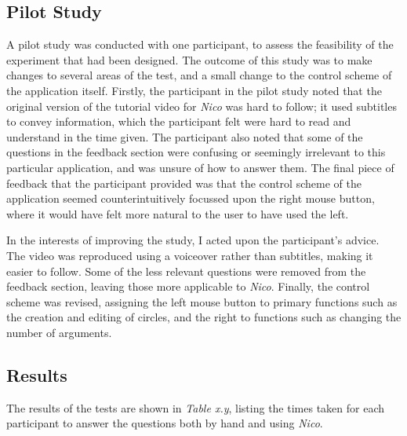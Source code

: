\documentclass[12pt,twoside,notitlepage,xetex]{report}
\begin{document}
\subsection{Pilot Study}

A pilot study was conducted with one participant, to assess the feasibility of
the experiment that had been designed.  The outcome of this study was to make
changes to several areas of the test, and a small change to the control scheme
of the application itself.  Firstly, the participant in the pilot study noted that the
original version of the tutorial video for \emph{Nico} was hard to follow; it
used subtitles to convey information, which the participant felt were hard to
read and understand in the time given.  The participant also noted that some of the
questions in the feedback section were confusing or seemingly irrelevant to
this particular application, and was unsure of how to answer them.  The final
piece of feedback that the participant provided was that the control scheme of the
application seemed counterintuitively focussed upon the right mouse button,
where it would have felt more natural to the user to have used the left.

In the interests of improving the study, I acted upon the participant's advice.
The video was reproduced using a voiceover rather than subtitles, making it
easier to follow.  Some of the less relevant questions were removed from the
feedback section, leaving those more applicable to \emph{Nico}.  Finally, the
control scheme was revised, assigning the left mouse button to primary
functions such as the creation and editing of circles, and the right to
functions such as changing the number of arguments.

\subsection{Results}

The results of the tests are shown in \emph{Table x.y}, listing the times taken
for each participant to answer the questions both by hand and using \emph{Nico}.
\end{document}
